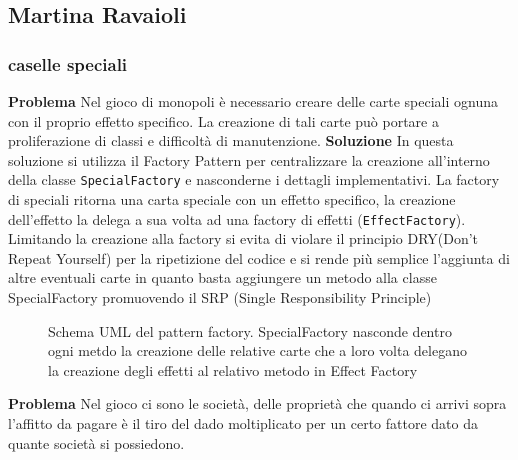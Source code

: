\subsection{Martina Ravaioli}

\subsubsection{caselle speciali}
\textbf{Problema}\newline
Nel gioco di monopoli è necessario creare delle carte speciali ognuna con il proprio effetto specifico. La creazione di tali carte può portare a proliferazione di classi e difficoltà di manutenzione.\newline
\textbf{Soluzione}\newline
In questa soluzione si utilizza il Factory Pattern per centralizzare la creazione all’interno della classe \texttt{SpecialFactory} e nasconderne i dettagli implementativi.
La factory di speciali ritorna una carta speciale con un effetto specifico, la creazione dell’effetto la delega a sua volta ad una factory di effetti (\texttt{EffectFactory}).
Limitando la creazione alla factory si evita di violare il principio DRY(Don’t Repeat Yourself) per la ripetizione del codice e si rende più semplice l’aggiunta di altre eventuali carte  in quanto basta aggiungere un metodo alla classe SpecialFactory promuovendo il SRP (Single Responsibility Principle)
\begin{figure}[H]
    \centering
    \caption{Schema UML del pattern factory. SpecialFactory nasconde dentro ogni metdo la creazione delle relative carte che a loro volta delegano la creazione degli effetti al relativo metodo in Effect Factory}
    \label{img:ArchitectureDiagram-Pagina-4}
\end{figure}
\textbf{Problema}\newline
Nel gioco ci sono le società, delle proprietà che quando ci arrivi sopra l’affitto da pagare è il tiro del dado moltiplicato per un certo fattore dato da quante società si possiedono. 

